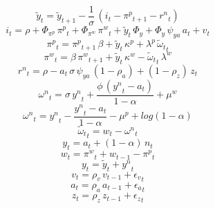\begin{dmath}
{{\tilde{y}}_{t}}={{\tilde{y}}_{t+1}}-\frac{1}{{{\sigma}}}\, \left({{i}_{t}}-{{\pi^p}_{t+1}}-{{r^n}_{t}}\right)
\end{dmath}
\begin{dmath}
{{i}_{t}}={{\rho}}+{{\Phi_{\pi^p}}}\, {{\pi^p}_{t}}+{{\Phi_{\pi^w}}}\, {{\pi^w}_{t}}+{{\tilde{y}}_{t}}\, {{\Phi_{y}}}+{{\Phi_{y}}}\, {{\psi_{ya}}}\, {{a}_{t}}+{{v}_{t}}
\end{dmath}
\begin{dmath}
{{\pi^p}_{t}}={{\pi^p}_{t+1}}\, {{\beta}}+{{\tilde{y}}_{t}}\, {{\kappa^p}}+{{\lambda^p}}\, {{\tilde{\omega}_t}_{t}}
\end{dmath}
\begin{dmath}
{{\pi^w}_{t}}={{\beta}}\, {{\pi^w}_{t+1}}+{{\tilde{y}}_{t}}\, {{\kappa^w}}-{{\tilde{\omega}_t}_{t}}\, {{\lambda^w}}
\end{dmath}
\begin{dmath}
{{r^n}_{t}}={{\rho}}-{{a}_{t}}\, {{\sigma}}\, {{\psi_{ya}}}\, \left(1-{{\rho_a}}\right)+\left(1-{{\rho_z}}\right)\, {{z}_{t}}
\end{dmath}
\begin{dmath}
{{\omega^n}_{t}}={{\sigma}}\, {{y^n}_{t}}+\frac{{{\phi}}\, \left({{y^n}_{t}}-{{a}_{t}}\right)}{1-{{\alpha}}}+{{\mu^w}}
\end{dmath}
\begin{dmath}
{{\omega^n}_{t}}={{y^n}_{t}}-\frac{{{y^n}_{t}}-{{a}_{t}}}{1-{{\alpha}}}-{{\mu^p}}+log\left(1-{{\alpha}}\right)
\end{dmath}
\begin{dmath}
{{\tilde{\omega}_t}_{t}}={{w}_{t}}-{{\omega^n}_{t}}
\end{dmath}
\begin{dmath}
{{y}_{t}}={{a}_{t}}+\left(1-{{\alpha}}\right)\, {{n}_{t}}
\end{dmath}
\begin{dmath}
{{w}_{t}}={{\pi^w}_{t}}+{{w}_{t-1}}-{{\pi^p}_{t}}
\end{dmath}
\begin{dmath}
{{y}_{t}}={{\tilde{y}}_{t}}+{{y^n}_{t}}
\end{dmath}
\begin{dmath}
{{v}_{t}}={{\rho_v}}\, {{v}_{t-1}}+{{\epsilon_v}_{t}}
\end{dmath}
\begin{dmath}
{{a}_{t}}={{\rho_a}}\, {{a}_{t-1}}+{{\epsilon_a}_{t}}
\end{dmath}
\begin{dmath}
{{z}_{t}}={{\rho_z}}\, {{z}_{t-1}}+{{\epsilon_z}_{t}}
\end{dmath}

